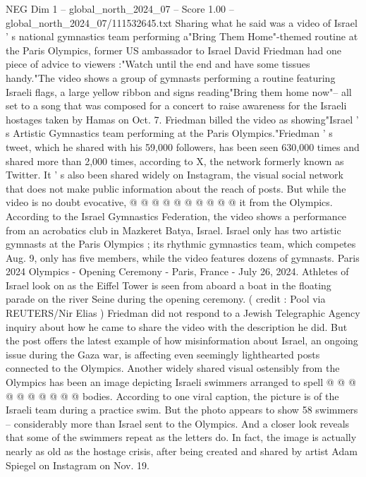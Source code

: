 \begin{textsample}{NEG Dim 1 – global\_north\_2024\_07 – Score 1.00 – global\_north\_2024\_07/111532645.txt}  \label{ex:f1_neg_063}
Sharing what he said was a video of Israel ' s national gymnastics team performing a"Bring Them Home"-themed routine at the Paris Olympics, former US ambassador to Israel David Friedman had one piece of advice to viewers :"Watch until the end and have some tissues handy."The video shows a group of gymnasts performing a routine featuring Israeli flags, a large yellow ribbon and signs reading"Bring them home now"-- all set to a song that was composed for a concert to raise awareness for the Israeli hostages taken by Hamas on Oct. 7.
Friedman billed the video as showing"Israel ' s Artistic Gymnastics team performing at the Paris Olympics."Friedman ' s tweet, which he shared with his 59,000 followers, has been seen 630,000 times and shared more than 2,000 times, according to X, the network formerly known as Twitter.
It ' s also been shared widely on Instagram, the visual social network that does not make public information about the reach of posts.
But while the video is no doubt evocative, @ @ @ @ @ @ @ @ @ @ it from the Olympics.
According to the Israel Gymnastics Federation, the video shows a performance from an acrobatics club in Mazkeret Batya, Israel.
Israel only has two artistic gymnasts at the Paris Olympics ; its rhythmic gymnastics team, which competes Aug. 9, only has five members, while the video features dozens of gymnasts.
Paris 2024 Olympics - Opening Ceremony - Paris, France - July 26, 2024.
Athletes of Israel look on as the Eiffel Tower is seen from aboard a boat in the floating parade on the river Seine during the opening ceremony. ( credit : Pool via REUTERS/Nir Elias ) Friedman did not respond to a Jewish Telegraphic Agency inquiry about how he came to share the video with the description he did.
But the post offers the latest example of how misinformation about Israel, an ongoing issue during the Gaza war, is affecting even seemingly lighthearted posts connected to the Olympics.
Another widely shared visual ostensibly from the Olympics has been an image depicting Israeli swimmers arranged to spell @ @ @ @ @ @ @ @ @ @ bodies.
According to one viral caption, the picture is of the Israeli team during a practice swim.
But the photo appears to show 58 swimmers -- considerably more than Israel sent to the Olympics.
And a closer look reveals that some of the swimmers repeat as the letters do.
In fact, the image is actually nearly as old as the hostage crisis, after being created and shared by artist Adam Spiegel on Instagram on Nov. 19.

\end{textsample}
